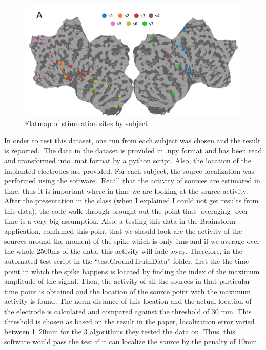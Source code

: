 \documentclass[12pt, titlepage]{article}
\begin{document}
\begin{figure}[H]
\centering
  \includegraphics[scale=0.3]{GTflatmap.png}
  \caption{Flatmap of stimulation sites by subject \cite{Mikulan2020} }
\label{Fig_SolChar}
\end{figure}

In order to test this dataset, one run from each subject was chosen and the result is reported.\ The data in the dataset is provided in .npy format and has been read and transformed into .mat format by a python script. Also, the location of the implanted electrodes are provided. For each subject, the source localization was performed using the software.\ Recall that the activity of sources are estimated in time, thus it is important where in time we are looking at the source activity. After the presentation in the class (when I explained I could not get results from this data), the code walk-through brought out the point that -averaging- over time is a very big assumption. Also, a testing this data in the Brainstorm application, confirmed this point that we should look are the activity of the sources around the moment of the spike which is only 1ms and if we average over the whole 2500ms of the data, this activity will fade away. Therefore, in the automated test script in the \enquote{testGroundTruthData} folder, first the the time point in which the spike happens is located by finding the index of the maximum amplitude of the signal. Then, the activity of all the sources in that particular time point is obtained and the location of the source point with the maximum activity is found. The norm distance of this location and the actual location of the electrode is calculated and compared against the threshold of 30 mm. This threshold is chosen as based on the result in the paper, localization error varied between 1~20mm for the 3 algorithms they tested the data on. Thus, this software would pass the test if it can localize the source by the penalty of 10mm.\\
\end{document}
